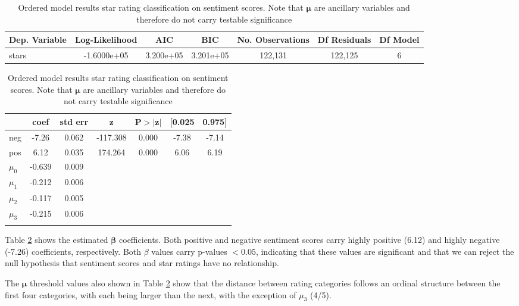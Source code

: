 \documentclass[sn-mathphys,Numbered]{sn-jnl}%
\theoremstyle{thmstyleone}%
\theoremstyle{thmstyletwo}%
\theoremstyle{thmstylethree}%
\begin{document}
\begin{table}[h!]
\centering
\begin{tabular}{l|c|c|c|c|c|c}
\hline
Dep. Variable & Log-Likelihood & AIC & BIC & No. Observations & Df Residuals & Df Model \\ \hline
stars         & -1.6000e+05     & 3.200e+05 & 3.201e+05 & 122,131         & 122,125      & 6       \\ \toprule
\end{tabular}
\begin{tabular}{l|c|c|c|c|c|c}
\hline
& coef   & std err & z        & P$>$$|$z$|$ & [0.025 & 0.975] \\ \hline
neg & -7.26 & 0.062 & -117.308 & 0.000 & -7.38 & -7.14 \\
pos & 6.12 & 0.035 & 174.264 & 0.000 & 6.06 & 6.19 \\ \midrule
$\mu_0$ & -0.639 & 0.009 \\
$\mu_1$ & -0.212 & 0.006 \\
$\mu_2$ & -0.117 & 0.005 \\
$\mu_3$ & -0.215 & 0.006 \\ \botrule
\end{tabular}
\caption{Ordered model results star rating classification on sentiment scores. Note that $\boldsymbol{\mu}$ are ancillary variables and therefore do not carry testable significance}
\label{tab:ordered_model_results}
\end{table}

Table \ref{tab:ordered_model_results} shows the estimated $\boldsymbol{\beta}$ coefficients. Both positive and negative sentiment scores carry highly positive (6.12) and highly negative (-7.26) coefficients, respectively. Both $\beta$ values carry p-values $< 0.05$, indicating that these values are significant and that we can reject the null hypothesis that sentiment scores and star ratings have no relationship.

The $\boldsymbol{\mu}$ threshold values also shown in Table \ref{tab:ordered_model_results} show that the distance between rating categories follows an ordinal structure between the first four categories, with each being larger than the next, with the exception of $\mu_3$ (4/5).
\end{document}
